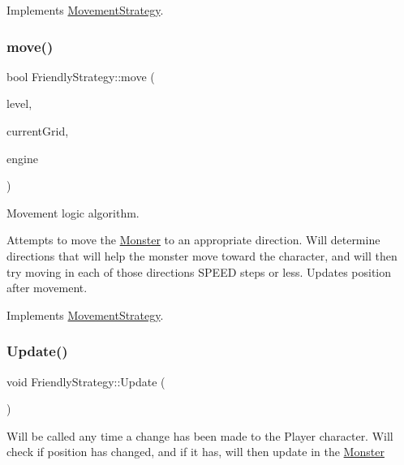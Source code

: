 Implements \hyperlink{class_movement_strategy}{Movement\+Strategy}.

\hypertarget{class_friendly_strategy_a8d0ce840204e9fd240ee0613d04ef803}{}\label{class_friendly_strategy_a8d0ce840204e9fd240ee0613d04ef803} 
\subsubsection{\texorpdfstring{move()}{move()}}
{\footnotesize\ttfamily bool Friendly\+Strategy\+::move (\begin{DoxyParamCaption}\item[{\hyperlink{class_pre_built_level}{Pre\+Built\+Level} $\ast$}]{level,  }\item[{S\+D\+L\+\_\+\+Rect $\ast$}]{current\+Grid,  }\item[{\hyperlink{class_game_play_engine}{Game\+Play\+Engine} $\ast$}]{engine }\end{DoxyParamCaption})\hspace{0.3cm}{\ttfamily [virtual]}}

Movement logic algorithm. 

Attempts to move the \hyperlink{class_monster}{Monster} to an appropriate direction. Will determine directions that will help the monster move toward the character, and will then try moving in each of those directions S\+P\+E\+ED steps or less. Updates position after movement. 

Implements \hyperlink{class_movement_strategy}{Movement\+Strategy}.

\hypertarget{class_friendly_strategy_a9758d387409a12ab2291c42e52313fcb}{}\label{class_friendly_strategy_a9758d387409a12ab2291c42e52313fcb} 
\subsubsection{\texorpdfstring{Update()}{Update()}}
{\footnotesize\ttfamily void Friendly\+Strategy\+::\+Update (\begin{DoxyParamCaption}{ }\end{DoxyParamCaption})\hspace{0.3cm}{\ttfamily [virtual]}}

Will be called any time a change has been made to the Player character. Will check if position has changed, and if it has, will then update in the \hyperlink{class_monster}{Monster} 

